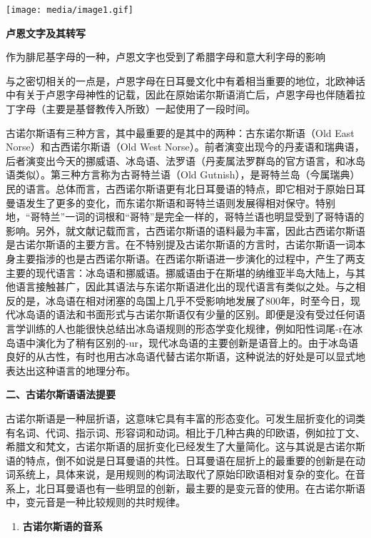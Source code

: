 \texttt{[image: media/image1.gif]}

\textbf{卢恩文字及其转写}

作为腓尼基字母的一种，卢恩文字也受到了希腊字母和意大利字母的影响

与之密切相关的一点是，卢恩字母在日耳曼文化中有着相当重要的地位，北欧神话中有关于卢恩字母神性的记载，因此在原始诺尔斯语消亡后，卢恩字母也伴随着拉丁字母（主要是基督教传入所致）一起使用了一段时间。

古诺尔斯语有三种方言，其中最重要的是其中的两种：古东诺尔斯语（Old East
Norse）和古西诺尔斯语（Old West
Norse）。前者演变出现今的丹麦语和瑞典语，后者演变出今天的挪威语、冰岛语、法罗语（丹麦属法罗群岛的官方语言，和冰岛语类似）。第三种方言称为古哥特兰语（Old
Gutnish），是哥特兰岛（今属瑞典）民的语言。总体而言，古西诺尔斯语更有北日耳曼语的特点，即它相对于原始日耳曼语发生了更多的变化，而东诺尔斯语和哥特兰语则发展得相对保守。特别地，``哥特兰''一词的词根和``哥特''是完全一样的，哥特兰语也明显受到了哥特语的影响。另外，就文献记载而言，古西诺尔斯语的语料最为丰富，因此古西诺尔斯语是古诺尔斯语的主要方言。在不特别提及古诺尔斯语的方言时，古诺尔斯语一词本身主要指涉的也是古西诺尔斯语。在西诺尔斯语进一步演化的过程中，产生了两支主要的现代语言：冰岛语和挪威语。挪威语由于在斯堪的纳维亚半岛大陆上，与其他语言接触甚广，因此其语法与东诺尔斯语进化出的现代语言有类似之处。与之相反的是，冰岛语在相对闭塞的岛国上几乎不受影响地发展了800年，时至今日，现代冰岛语的语法和书面形式与古诺尔斯语仅有少量的区别。即便是没有受过任何语言学训练的人也能很快总结出冰岛语规则的形态学变化规律，例如阳性词尾-r在冰岛语中演化为了稍有区别的-ur，现代冰岛语的主要创新是语音上的。由于冰岛语良好的从古性，有时也用古冰岛语代替古诺尔斯语，这种说法的好处是可以显式地表达出这种语言的地理分布。

\textbf{二、古诺尔斯语语法提要}

古诺尔斯语是一种屈折语，这意味它具有丰富的形态变化。可发生屈折变化的词类有名词、代词、指示词、形容词和动词。相比于几种古典的印欧语，例如拉丁文、希腊文和梵文，古诺尔斯语的屈折变化已经发生了大量简化。这与其说是古诺尔斯语的特点，倒不如说是日耳曼语的共性。日耳曼语在屈折上的最重要的创新是在动词系统上，具体来说，是用规则的构词法取代了原始印欧语相对复杂的变化。在音系上，北日耳曼语也有一些明显的创新，最主要的是变元音的使用。在古诺尔斯语中，变元音是一种比较规则的共时规律。

\begin{enumerate}
  \def\labelenumi{\Alph{enumi}.}
  \item
        \textbf{古诺尔斯语的音系}
\end{enumerate}

